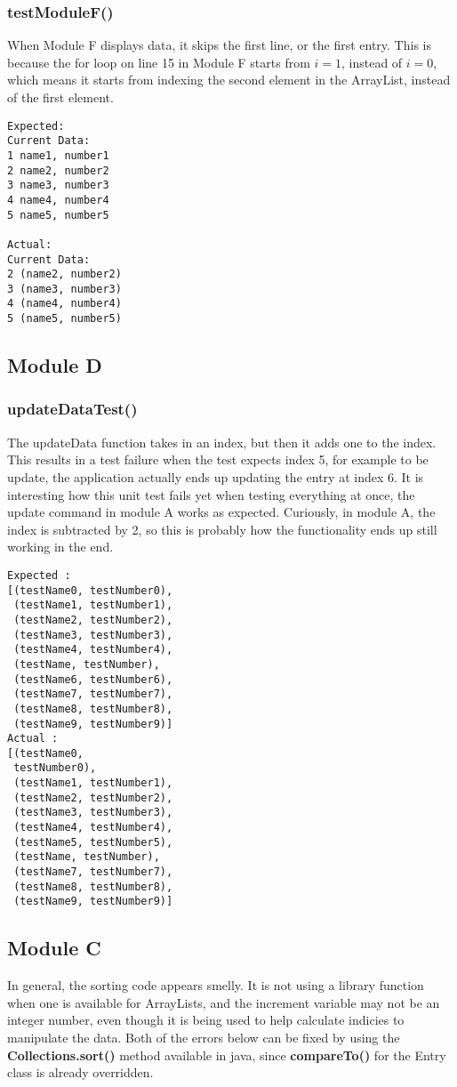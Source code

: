 \subsubsection{testModuleF()}
When Module F displays data, it skips the first line, or the first entry. This
is because the for loop on line 15 in Module F starts from $i=1$, instead of
$i=0$, which means it starts from indexing the second element in the ArrayList,
instead of the first element.

\begin{verbatim}
Expected:
Current Data:
1 name1, number1
2 name2, number2
3 name3, number3
4 name4, number4
5 name5, number5

Actual:
Current Data:
2 (name2, number2)
3 (name3, number3)
4 (name4, number4)
5 (name5, number5)
\end{verbatim}

\subsection{Module D}
\subsubsection{updateDataTest()}
The updateData function takes in an index, but then it adds one to the index.
This results in a test failure when the test expects index 5, for example to be
update, the application actually ends up updating the entry at index 6.
It is interesting how this unit test fails yet when testing everything at once,
the update command in module A works as expected. Curiously, in module A,
the index is subtracted by 2, so this is probably how the functionality
ends up still working in the end.

\begin{verbatim}
Expected :
[(testName0, testNumber0),
 (testName1, testNumber1),
 (testName2, testNumber2),
 (testName3, testNumber3),
 (testName4, testNumber4),
 (testName, testNumber),
 (testName6, testNumber6),
 (testName7, testNumber7),
 (testName8, testNumber8),
 (testName9, testNumber9)]
Actual :
[(testName0,
 testNumber0),
 (testName1, testNumber1),
 (testName2, testNumber2),
 (testName3, testNumber3),
 (testName4, testNumber4),
 (testName5, testNumber5),
 (testName, testNumber),
 (testName7, testNumber7),
 (testName8, testNumber8),
 (testName9, testNumber9)]
\end{verbatim}


\subsection{Module C}
In general, the sorting code appears smelly. It is not using a library function
when one is available for ArrayLists, and the increment variable may not be an
integer number, even though it is being used to help calculate indicies to
manipulate the data. Both of the errors below can be fixed by using the
\textbf{Collections.sort()} method available in java, since \textbf{compareTo()}
for the Entry class is already overridden.
